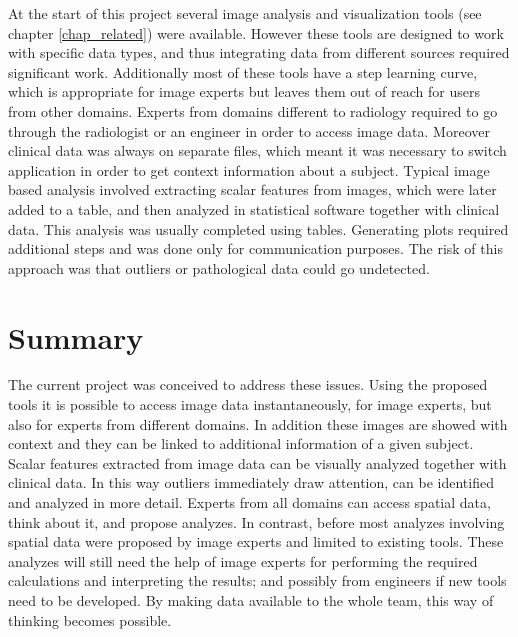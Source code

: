 

At the start of this project several image analysis and visualization tools (see chapter \ref{chap_related}) were available. However these tools are designed to work with specific data types, and thus integrating data from different sources required significant work. Additionally most of these tools have a step learning curve, which is appropriate for image experts but leaves them out of reach for users from other domains. Experts from domains different to radiology required to go through the radiologist or an engineer in order to access image data. Moreover clinical data was always on separate files, which meant it was necessary to switch application in order to get context information about a subject. Typical image based analysis involved extracting scalar features from images, which were later added to a table, and then analyzed in statistical software together with clinical data. This analysis was usually completed using tables. Generating plots required additional steps and was done only for communication purposes. The risk of this approach was that outliers or pathological data could go undetected. 

\section{Summary}

The current project was conceived to address these issues. Using the proposed tools it is possible to access image data instantaneously,  for image experts, but also for experts from different domains. In addition these images are showed with context and they can be linked to additional information of a given subject. Scalar features extracted from image data can be visually analyzed together with clinical data. In this way outliers immediately draw attention, can be identified and analyzed in more detail. Experts from all domains can access spatial data, think about it, and propose analyzes. In contrast, before most analyzes involving spatial data were proposed by image experts and limited to existing tools. These analyzes will still need the help of image experts for performing the required calculations and interpreting the results; and possibly from engineers if new tools need to be developed. By making data available to the whole team, this way of thinking becomes possible.    

